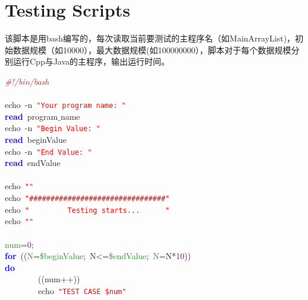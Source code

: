 \chapter{Testing Scripts}
该脚本是用bash编写的，每次读取当前要测试的主程序名（如MainArrayList)，初始数据规模（如10000），最大数据规模(如100000000），脚本对于每个数据规模分别运行Cpp与Java的主程序，输出运行时间。
\par
\vspace{4mm}
\noindent
\mbox{}\textit{\textcolor{Brown}{\#!/bin/bash}} \\
\mbox{} \\
\mbox{}echo\ -n\ \texttt{\textcolor{Red}{"{}Your\ program\ name:\ "{}}} \\
\mbox{}\textbf{\textcolor{Blue}{read}}\ program$\_$name \\
\mbox{}echo\ -n\ \texttt{\textcolor{Red}{"{}Begin\ Value:\ "{}}} \\
\mbox{}\textbf{\textcolor{Blue}{read}}\ beginValue \\
\mbox{}echo\ -n\ \texttt{\textcolor{Red}{"{}End\ Value:\ "{}}} \\
\mbox{}\textbf{\textcolor{Blue}{read}}\ endValue \\
\mbox{} \\
\mbox{}echo\ \texttt{\textcolor{Red}{"{}"{}}} \\
\mbox{}echo\ \texttt{\textcolor{Red}{"{}\#\#\#\#\#\#\#\#\#\#\#\#\#\#\#\#\#\#\#\#\#\#\#\#\#\#\#\#\#\#\#\#"{}}} \\
\mbox{}echo\ \texttt{\textcolor{Red}{"{}\ \ \ \ \ \ \ \ \ Testing\ starts...\ \ \ \ \ \ "{}}} \\
\mbox{}echo\ \texttt{\textcolor{Red}{"{}"{}}} \\
\mbox{} \\
\mbox{}\textcolor{ForestGreen}{num}\textcolor{BrickRed}{=}\textcolor{Purple}{0}\textcolor{BrickRed}{;} \\
\mbox{}\textbf{\textcolor{Blue}{for}}\ \textcolor{BrickRed}{((}\textcolor{ForestGreen}{N}\textcolor{BrickRed}{=}\textcolor{ForestGreen}{\$beginValue}\textcolor{BrickRed}{;}\ N\textcolor{BrickRed}{\textless{}=}\textcolor{ForestGreen}{\$endValue}\textcolor{BrickRed}{;}\ \textcolor{ForestGreen}{N}\textcolor{BrickRed}{=}N\textcolor{BrickRed}{*}\textcolor{Purple}{10}\textcolor{BrickRed}{))} \\
\mbox{}\textbf{\textcolor{Blue}{do}} \\
\mbox{}\ \ \ \ \ \ \ \ \textcolor{BrickRed}{((}num\textcolor{BrickRed}{++))} \\
\mbox{}\ \ \ \ \ \ \ \ echo\ \texttt{\textcolor{Red}{"{}TEST\ CASE\ \$num"{}}} \\
